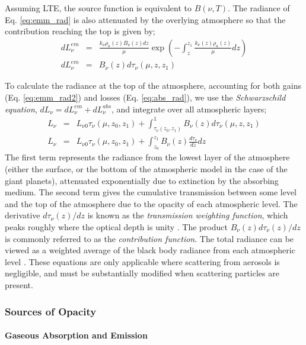 \documentclass[final,5p,times,twocolumn,authoryear]{elsarticle}
\begin{document}
Assuming LTE, the source function is equivalent to $B(\nu,T)$.  The radiance of Eq. \ref{eq:emm_rad} is also attenuated by the overlying atmosphere so that the contribution reaching the top is given by;
\begin{eqnarray}
dL_{\nu}^{em} &=& \frac{k_{\nu}\rho_a(z)B_\nu(z)dz}{\mu}\exp\left(-\int_{z}^{z_1}\frac{k_\nu(z)\rho_a(z)}{\mu}dz\right) \\
dL_{\nu}^{em} &=& B_\nu(z) d\tau_{\nu}(\mu,z,z_1)
\label{eq:emm_rad2}
\end{eqnarray}

To calculate the radiance at the top of the atmosphere, accounting for both gains (Eq. \ref{eq:emm_rad2}) and losses (Eq. \ref{eq:abs_rad}), we use the \textit{Schwarzschild equation}, $dL_\nu=dL_{\nu}^{em}+dL_{\nu}^{abs}$, and integrate over all atmospheric layers;
\begin{eqnarray}
L_\nu&=& L_{\nu0}\tau_\nu(\mu,z_0,z_1)+\int^1_{\tau_\nu(z_0,z_1)} B_{\nu}(z)d\tau_\nu(\mu,z,z_1) \\
L_\nu&=& L_{\nu0}\tau_\nu(\mu,z_0,z_1)+\int^{z_1}_{z_0} B_{\nu}(z) \frac{d\tau_\nu}{dz}dz
\label{eq:radiance_at_top}
\end{eqnarray}
The first term represents the radiance from the lowest layer of the atmosphere (either the surface, or the bottom of the atmospheric model in the case of the giant planets), attenuated exponentially due to extinction by the absorbing medium.  The second term gives the cumulative transmission between some level and the top of the atmosphere due to the opacity of each atmospheric level.  The derivative $d\tau_{\nu}(z)/dz$ is known as the \textit{transmission weighting function}, which peaks roughly where the optical depth is unity \citep{03irwbook}. The product $B_\nu(z)d\tau_{\nu}(z)/dz$ is commonly referred to as the \textit{contribution function}.  The total radiance can be viewed as a weighted average of the black body radiance from each atmospheric level \citep{84houghton}.  These equations are only applicable where scattering from aerosols is negligible, and must be substantially modified when scattering particles are present.

\subsubsection{Sources of Opacity}
\paragraph{Gaseous Absorption and Emission}
\end{document}
